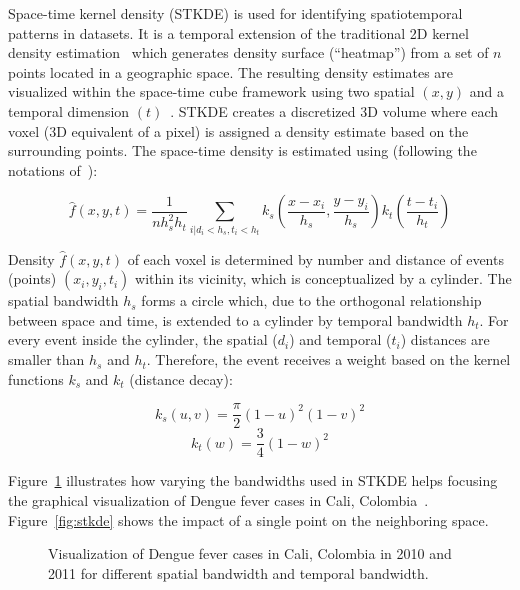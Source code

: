 \documentclass[10pt, conference, compsocconf]{IEEEtran}
\begin{document}
Space-time kernel density (STKDE) is used for identifying
spatiotemporal patterns in datasets. It is a temporal
extension of the traditional 2D kernel density
estimation~\cite{Silverman86} which generates density surface
(``heatmap'') from a set of $n$ points located in a geographic space. The resulting density
estimates are visualized within the space-time cube framework using two spatial $(x,
y)$ and a temporal dimension $(t)$~\cite{Nakaya10}. STKDE creates a discretized 3D
 volume where each voxel (3D equivalent of a pixel) is assigned a
density estimate based on the surrounding points. The space-time
density is estimated using (following the notations
of~\cite{Hohl16}):

$$ \hat{f} (x, y, t) = \frac{1}{n h_s^2 h_t} \sum_{i | d_i < h_s, t_i<h_t}
k_s (\frac{x-x_i}{h_s},\frac{y-y_i}{h_s}) k_t(\frac{t-t_i}{h_t})$$

Density $\hat{f} (x, y, t)$ of each voxel is determined by number and distance of events (points)
$(x_i, y_i, t_i)$ within its vicinity, which is conceptualized by a
cylinder. The spatial bandwidth $h_s$ forms a circle which, due to the
orthogonal relationship between space and time, is extended to a
cylinder by temporal bandwidth $h_t$. For every event inside the
cylinder, the spatial ($d_i$) and temporal ($t_i$) distances are smaller
than $h_s$ and $h_t$. Therefore, the event receives a weight based on the
kernel functions $k_s$ and $k_t$ (distance decay):

$$k_s (u,v) = \frac{\pi}{2} (1-u)^2 (1-v)^2$$
$$k_t (w) = \frac{3}{4} (1-w)^2$$

Figure~\ref{fig:stkde-ex} illustrates how varying the bandwidths used
in STKDE helps focusing the graphical visualization of Dengue fever
cases in Cali, Colombia~\cite{Delmelle14}. Figure~\ref{fig:stkde} shows the impact
of a single point on the neighboring space.

\begin{figure}
  \caption{Visualization of Dengue fever cases in Cali, Colombia in
    2010 and 2011 for different spatial bandwidth and temporal bandwidth.}
  \label{fig:stkde-ex}
\end{figure}
\end{document}
